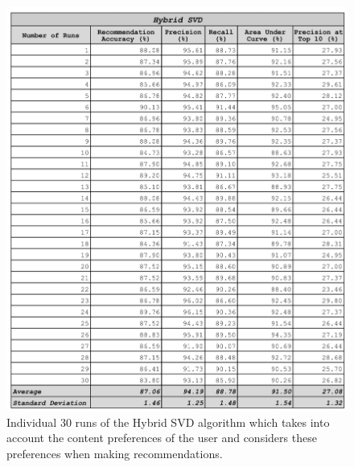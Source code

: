 \begin{appendices}
\begin{figure}
\centering
\includegraphics[scale=0.3]{appendices/hybrid_als_30_runs.png}
\caption{Individual 30 runs of the Hybrid SVD algorithm which takes into account the content preferences of the user and considers these preferences when making recommendations.}
\label{fig:dual_algorithm}
\end{figure}


\end{appendices}
